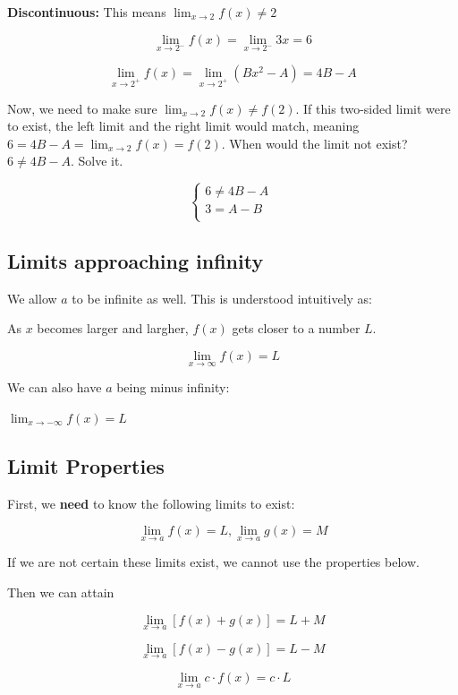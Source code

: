 \documentclass[
]{article}
\begin{document}
\textbf{Discontinuous:} This means
$\lim_{x \rightarrow 2}{f(x) \neq 2}$

$$\lim_{x \rightarrow 2^{-}}{f(x) =}\lim_{x \rightarrow 2^{-}}3x = 6$$

$$\lim_{x \rightarrow 2^{+}}{f(x) = \lim_{x \rightarrow 2^{+}}(Bx^{2} - A)} = 4B - A$$

Now, we need to make sure $\lim_{x \rightarrow 2}{f(x)} \neq f(2)$. If
this two-sided limit were to exist, the left limit and the right limit
would match, meaning
$6 = 4B - A = \lim_{x \rightarrow 2}{f(x)} = f(2)$. When would the
limit not exist? $6 \neq 4B - A$. Solve it.

$$\left\{ \begin{matrix}
6 \neq 4B - A \\
3 = A - B \\
\end{matrix} \right.\ $$


\subsection{Limits approaching
infinity}

We allow $a$ to be infinite as well. This is understood intuitively
as:

As $x$ becomes larger and largher, $f(x)$ gets closer to a number
$L$.

$$\lim_{x \rightarrow \infty}{f(x) = L}$$

We can also have $a$ being minus infinity:

$\lim_{x \rightarrow - \infty}{f(x) = L}$


\subsection{Limit Properties}

First, we \textbf{need} to know the following limits to exist:

$$\lim_{x \rightarrow a}{f(x) = L},\lim_{x \rightarrow a}{g(x) = M}$$

If we are not certain these limits exist, we cannot use the properties
below.

Then we can attain

$$\lim_{x \rightarrow a}{\left\lbrack f(x) + g(x) \right\rbrack = L + M}$$

$$\lim_{x \rightarrow a}{\left\lbrack f(x) - g(x) \right\rbrack = L - M}$$

$$\lim_{x \rightarrow a}{c \cdot f(x) = c \cdot L}$$
\end{document}
